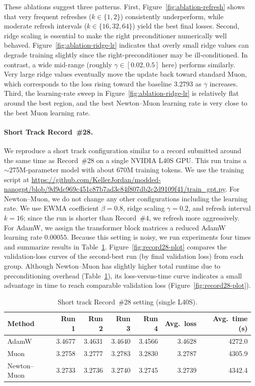 \documentclass[11pt]{article}
\begin{document}
These ablations suggest three patterns. First, Figure~\ref{fig:ablation-refresh} shows that very frequent refreshes ($k\in\{1,2\}$) consistently underperform, while
moderate refresh intervals ($k\in\{16,32,64\}$) yield the best final losses. 
Second, ridge scaling is essential to make the right preconditioner numerically well behaved. Figure~\ref{fig:ablation-ridge-lr} indicates that overly small ridge values can degrade
training slightly since the right-preconditioner may be ill-conditioned. In contrast, a wide mid-range (roughly
$\gamma\in[0.02,0.5]$ here) performs similarly. Very large ridge values eventually move the update back toward
standard Muon, which corresponds to the loss rising toward the baseline 3.2793 as $\gamma$ increases.
Third, the learning-rate sweep in Figure~\ref{fig:ablation-ridge-lr} is relatively flat around the best region, and the best Newton--Muon learning rate is very close to the best Muon learning rate.


\paragraph{Short Track Record~\#28.}
We reproduce a short track configuration similar to a record submitted around the same time as Record~\#28 on a single NVIDIA L40S GPU. This run trains a $\sim$275M-parameter model with about $670$M training tokens. We use the training script at
\url{https://github.com/KellerJordan/modded-nanogpt/blob/9d9dc969c451c87b7ad3c84f807db2c2d9109f41/train_gpt.py}. For Newton--Muon, we do not change any other configurations including the learning rate. We use EWMA coefficient $\beta=0.8$, ridge scaling $\gamma=0.2$, and refresh interval $k=16$; since
the run is shorter than Record~\#4, we refresh more aggressively. 
For AdamW, we assign the transformer block matrices a reduced AdamW learning rate $0.00055$.
Because this setting is noisy, we run experiments four times and summarize results in Table~\ref{tab:record28-summary}. Figure~\ref{fig:record28-plot} compares the validation-loss curves of
the second-best run (by final validation loss) from each group. Although Newton--Muon has slightly higher total runtime due to preconditioning overhead (Table~\ref{tab:record28-summary}), its loss-versus-time curve indicates a small advantage in time to reach comparable validation loss (Figure~\ref{fig:record28-plot}).

\begin{table}[htb]
  \centering
  \begin{tabular}{l r r r r r r}
    \hline
    Method & Run 1 & Run 2 & Run 3 & Run 4 & Avg.\ loss & Avg.\ time (s) \\
    \hline
    AdamW & 3.4677 & 3.4631 & 3.4640 & 3.4566 & 3.4628 & 4272.0 \\
    Muon & 3.2758 & 3.2777 & 3.2783 & 3.2830 & 3.2787 & 4305.9 \\
    Newton--Muon & 3.2733 & 3.2736 & 3.2740 & 3.2745 & 3.2739 & 4342.4 \\
    \hline
  \end{tabular}
  \caption{Short track Record~\#28 setting (single L40S).}
  \label{tab:record28-summary}
\end{table}
\end{document}
